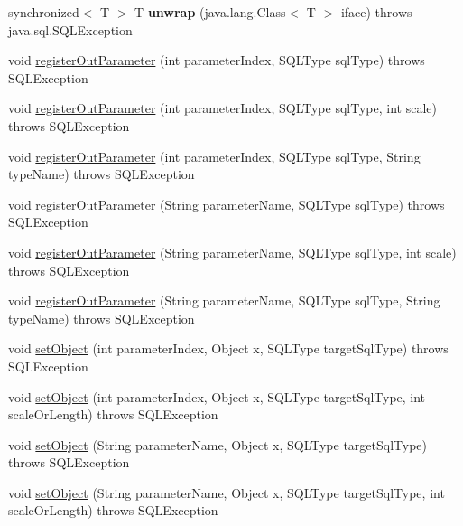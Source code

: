 \begin{DoxyCompactItemize}
\item 
\mbox{\label{classcom_1_1mysql_1_1cj_1_1jdbc_1_1_callable_statement_wrapper_aa7ce77aa93341891ae30260b6f45f44c}} 
synchronized$<$ T $>$ T {\bfseries unwrap} (java.\+lang.\+Class$<$ T $>$ iface)  throws java.\+sql.\+S\+Q\+L\+Exception 
\item 
void \mbox{\hyperlink{classcom_1_1mysql_1_1cj_1_1jdbc_1_1_callable_statement_wrapper_af4aee929eae36cbfce7e4117ef082022}{register\+Out\+Parameter}} (int parameter\+Index, S\+Q\+L\+Type sql\+Type)  throws S\+Q\+L\+Exception 
\item 
void \mbox{\hyperlink{classcom_1_1mysql_1_1cj_1_1jdbc_1_1_callable_statement_wrapper_afae5e49fafc4ef1689f150d9b3fd68d7}{register\+Out\+Parameter}} (int parameter\+Index, S\+Q\+L\+Type sql\+Type, int scale)  throws S\+Q\+L\+Exception 
\item 
void \mbox{\hyperlink{classcom_1_1mysql_1_1cj_1_1jdbc_1_1_callable_statement_wrapper_af76a8454598300c9faa06bcc13ca8356}{register\+Out\+Parameter}} (int parameter\+Index, S\+Q\+L\+Type sql\+Type, String type\+Name)  throws S\+Q\+L\+Exception 
\item 
void \mbox{\hyperlink{classcom_1_1mysql_1_1cj_1_1jdbc_1_1_callable_statement_wrapper_a8a349c3129cd8b7debe8235cfaf005cf}{register\+Out\+Parameter}} (String parameter\+Name, S\+Q\+L\+Type sql\+Type)  throws S\+Q\+L\+Exception 
\item 
void \mbox{\hyperlink{classcom_1_1mysql_1_1cj_1_1jdbc_1_1_callable_statement_wrapper_a3e4ad60bf29fe1256bbc49a301242e31}{register\+Out\+Parameter}} (String parameter\+Name, S\+Q\+L\+Type sql\+Type, int scale)  throws S\+Q\+L\+Exception 
\item 
void \mbox{\hyperlink{classcom_1_1mysql_1_1cj_1_1jdbc_1_1_callable_statement_wrapper_a896a5964296a43bfe85a30f9670b6164}{register\+Out\+Parameter}} (String parameter\+Name, S\+Q\+L\+Type sql\+Type, String type\+Name)  throws S\+Q\+L\+Exception 
\item 
void \mbox{\hyperlink{classcom_1_1mysql_1_1cj_1_1jdbc_1_1_callable_statement_wrapper_a8afb5f2b99f3996c750784b0b64b1400}{set\+Object}} (int parameter\+Index, Object x, S\+Q\+L\+Type target\+Sql\+Type)  throws S\+Q\+L\+Exception 
\item 
void \mbox{\hyperlink{classcom_1_1mysql_1_1cj_1_1jdbc_1_1_callable_statement_wrapper_a9ae0fd6a5dbe913227b9460cc91b7afe}{set\+Object}} (int parameter\+Index, Object x, S\+Q\+L\+Type target\+Sql\+Type, int scale\+Or\+Length)  throws S\+Q\+L\+Exception 
\item 
void \mbox{\hyperlink{classcom_1_1mysql_1_1cj_1_1jdbc_1_1_callable_statement_wrapper_a98e6163466b99b12af477410c077e3b1}{set\+Object}} (String parameter\+Name, Object x, S\+Q\+L\+Type target\+Sql\+Type)  throws S\+Q\+L\+Exception 
\item 
void \mbox{\hyperlink{classcom_1_1mysql_1_1cj_1_1jdbc_1_1_callable_statement_wrapper_a581e216a4043776d8b182adc802d93bc}{set\+Object}} (String parameter\+Name, Object x, S\+Q\+L\+Type target\+Sql\+Type, int scale\+Or\+Length)  throws S\+Q\+L\+Exception 
\end{DoxyCompactItemize}
